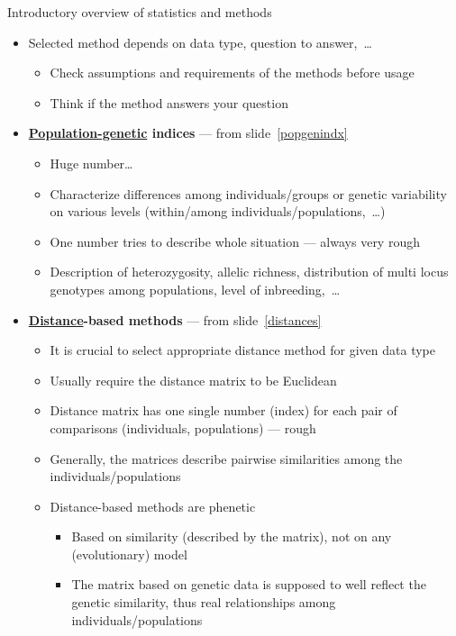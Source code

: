 \documentclass[compress, ucs, xelatex, 11pt, xcolor=svgnames, aspectratio=169,
	hyperref={
		bookmarks=true,
		unicode=true,
		colorlinks=true,
		pdftitle={Molecular data in R},
		plainpages=false,
		pdfauthor={Vojtech Zeisek},
		pdfsubject={Course about phylogeny and evolution in R},
		pdfcreator={XeLaTeX},
		pdfkeywords={R, evolution, phylogeny, molecular data},
		linkcolor=Crimson, %
		anchorcolor=Magenta, %
		citecolor=Magenta, %
		filecolor=Magenta, %
		menucolor=Magenta, %
		urlcolor=DodgerBlue, %
		pdftex},
	url={hyphens, lowtilde} %
	]{beamer}
\begin{document}
\begin{frame}[allowframebreaks]{Introductory overview of statistics and methods}
	\begin{itemize}
		\item \alert{Selected method depends on data type, question to answer,~\ldots}
		\begin{itemize}
			\item Check assumptions and requirements of the methods before usage
			\item Think if the method answers your question
		\end{itemize}
		\item \textbf{\href{https://en.wikipedia.org/wiki/Population_genetics}{Population-genetic} indices} --- from slide~\ref{popgenindx}
		\begin{itemize}
			\item Huge number\ldots
			\item Characterize differences among individuals/groups or genetic variability on various levels (within/among individuals/populations,~\ldots)
			\item One number tries to describe whole situation --- always very rough
			\item Description of heterozygosity, allelic richness, distribution of multi locus genotypes among populations, level of inbreeding,~\ldots
		\end{itemize}
		\item \textbf{\href{https://en.wikipedia.org/wiki/Genetic_distance}{Distance}-based methods} --- from slide~\ref{distances}
		\begin{itemize}
			\item \alert{It is crucial to select appropriate distance method for given data type}
			\item Usually require the distance matrix to be Euclidean
			\item Distance matrix has one single number (index) for each pair of comparisons (individuals, populations) --- rough
			\item Generally, the matrices describe pairwise similarities among the individuals/populations
			\item Distance-based methods are phenetic
			\begin{itemize}
				\item Based on similarity (described by the matrix), not on any (evolutionary) model
				\item The matrix based on genetic data is supposed to well reflect the genetic similarity, thus real relationships among individuals/populations

\end{itemize}
\end{itemize}
\end{itemize}
\end{frame}
\end{document}
